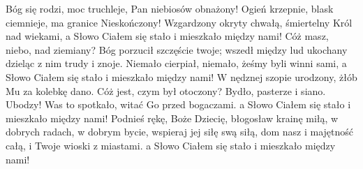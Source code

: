 \beginverse
Bóg się rodzi, moc truchleje,
Pan niebiosów obnażony!
Ogień krzepnie, blask ciemnieje,
ma granice Nieskończony!
Wzgardzony okryty chwałą,
śmiertelny Król nad wiekami,
a Słowo Ciałem się stało
i mieszkało między nami!
\endverse
\beginverse
Cóż masz, niebo, nad ziemiany?
Bóg porzucił szczęście twoje;
wszedł między lud ukochany
dzieląc z nim trudy i znoje.
Niemało cierpiał, niemało,
żeśmy byli winni sami,
a Słowo Ciałem się stało
i mieszkało między nami!
\endverse
\beginverse
W nędznej szopie urodzony,
żłób Mu za kolebkę dano.
Cóż jest, czym był otoczony?
Bydło, pasterze i siano.
Ubodzy! Was to spotkało,
witać Go przed bogaczami.
a Słowo Ciałem się stało
i mieszkało między nami!
\endverse
\beginverse
Podnieś rękę, Boże Dziecię,
błogosław krainę miłą,
w dobrych radach, w dobrym bycie,
wspieraj jej siłę swą siłą,
dom nasz i majętność całą,
i Twoje wioski z miastami.
a Słowo Ciałem się stało
i mieszkało między nami!
\endverse
\endsong